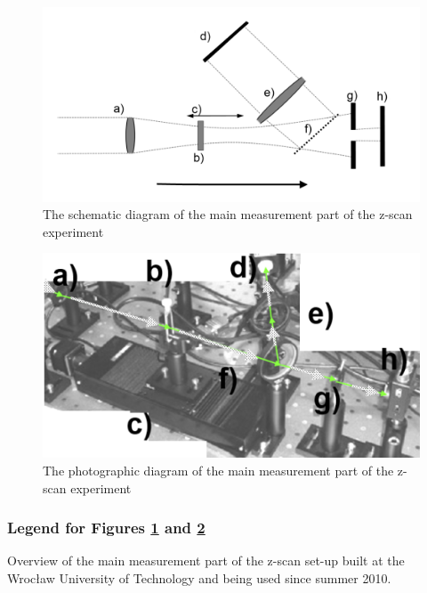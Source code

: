 \documentclass[12pt,twoside,a4paper]{article}
\numberwithin{equation}{subsection}
\numberwithin{figure}{subsection}
\begin{document}
\begin{figure}
 \includegraphics{img/zscan_sch.png}
 \caption{ The schematic diagram of the main measurement part of the z-scan experiment 
 \label{fig:zscan_sch}}
\end{figure}

\begin{figure}
 \includegraphics{img/zscan_diag.png}
 \caption{The photographic diagram of the main measurement part of the z-scan experiment 
 \label{fig:zscan_diag}}
\end{figure}

\subsubsection*{Legend for Figures \ref{fig:zscan_sch} and \ref{fig:zscan_diag}} 
Overview of the main measurement part of the z-scan set-up built at the Wrocław University of Technology and being used since summer 2010.
 
\end{document}
